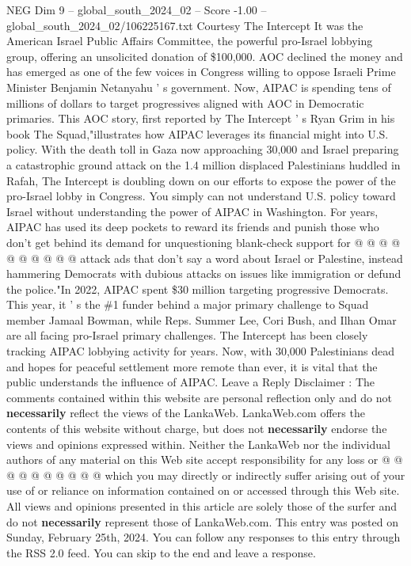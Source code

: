 \begin{textsample}{NEG Dim 9 – global\_south\_2024\_02 – Score -1.00 – global\_south\_2024\_02/106225167.txt}  \label{ex:f9_neg_357}
Courtesy The Intercept It was the American Israel Public Affairs Committee, the powerful pro-Israel lobbying group, offering an unsolicited donation of \$100,000.
AOC declined the money and has emerged as one of the few voices in Congress willing to oppose Israeli Prime Minister Benjamin Netanyahu ' s government.
Now, AIPAC is spending tens of millions of dollars to target progressives aligned with AOC in Democratic primaries.
This AOC story, first reported by The Intercept ' s Ryan Grim in his book The Squad,"illustrates how AIPAC leverages its financial might into U.S. policy.
With the death toll in Gaza now approaching 30,000 and Israel preparing a catastrophic ground attack on the 1.4 million displaced Palestinians huddled in Rafah, The Intercept is doubling down on our efforts to expose the power of the pro-Israel lobby in Congress.
You simply can not understand U.S. policy toward Israel without understanding the power of AIPAC in Washington.
For years, AIPAC has used its deep pockets to reward its friends and punish those who don't get behind its demand for unquestioning blank-check support for @ @ @ @ @ @ @ @ @ @ attack ads that don't say a word about Israel or Palestine, instead hammering Democrats with dubious attacks on issues like immigration or defund the police."In 2022, AIPAC spent \$30 million targeting progressive Democrats.
This year, it ' s the \#1 funder behind a major primary challenge to Squad member Jamaal Bowman, while Reps.
Summer Lee, Cori Bush, and Ilhan Omar are all facing pro-Israel primary challenges.
The Intercept has been closely tracking AIPAC lobbying activity for years.
Now, with 30,000 Palestinians dead and hopes for peaceful settlement more remote than ever, it is vital that the public understands the influence of AIPAC.
Leave a Reply Disclaimer : The comments contained within this website are personal reflection only and do not \textbf{necessarily} reflect the views of the LankaWeb.
LankaWeb.com offers the contents of this website without charge, but does not \textbf{necessarily} endorse the views and opinions expressed within.
Neither the LankaWeb nor the individual authors of any material on this Web site accept responsibility for any loss or @ @ @ @ @ @ @ @ @ @ which you may directly or indirectly suffer arising out of your use of or reliance on information contained on or accessed through this Web site.
All views and opinions presented in this article are solely those of the surfer and do not \textbf{necessarily} represent those of LankaWeb.com.
This entry was posted on Sunday, February 25th, 2024.
You can follow any responses to this entry through the RSS 2.0 feed.
You can skip to the end and leave a response.

\end{textsample}
